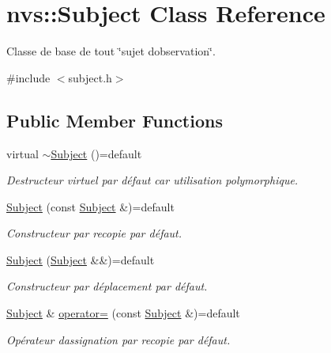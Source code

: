 \hypertarget{classnvs_1_1_subject}{}\section{nvs\+:\+:Subject Class Reference}
\label{classnvs_1_1_subject}


Classe de base de tout \char`\"{}sujet d\textquotesingle{}observation\char`\"{}.  




{\ttfamily \#include $<$subject.\+h$>$}

\subsection*{Public Member Functions}
\begin{DoxyCompactItemize}
\item 
\mbox{\label{classnvs_1_1_subject_ae6c2083563615d4f449f55b970835816}} 
virtual \mbox{\hyperlink{classnvs_1_1_subject_ae6c2083563615d4f449f55b970835816}{$\sim$\+Subject}} ()=default
\begin{DoxyCompactList}\small\item\em Destructeur virtuel par défaut car utilisation polymorphique. \end{DoxyCompactList}\item 
\mbox{\hyperlink{classnvs_1_1_subject_acb8bf74c98c8ec96d999ce98cd3fab22}{Subject}} (const \mbox{\hyperlink{classnvs_1_1_subject}{Subject}} \&)=default
\begin{DoxyCompactList}\small\item\em Constructeur par recopie par défaut. \end{DoxyCompactList}\item 
\mbox{\hyperlink{classnvs_1_1_subject_a228776e466dd330075d3f4a089c006f4}{Subject}} (\mbox{\hyperlink{classnvs_1_1_subject}{Subject}} \&\&)=default
\begin{DoxyCompactList}\small\item\em Constructeur par déplacement par défaut. \end{DoxyCompactList}\item 
\mbox{\hyperlink{classnvs_1_1_subject}{Subject}} \& \mbox{\hyperlink{classnvs_1_1_subject_aba16a1e0481f97b74a66468dab1d50bf}{operator=}} (const \mbox{\hyperlink{classnvs_1_1_subject}{Subject}} \&)=default
\begin{DoxyCompactList}\small\item\em Opérateur d\textquotesingle{}assignation par recopie par défaut. \end{DoxyCompactList}\item 

\end{DoxyCompactItemize}
